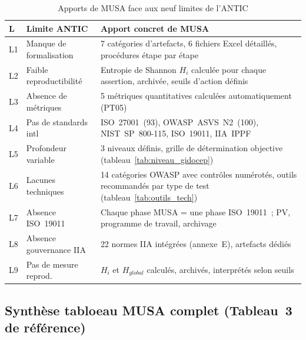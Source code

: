 \documentclass[12pt,a4paper,oneside]{report}
\begin{document}
\begin{table}[H]
\centering\small
\caption{Apports de MUSA face aux neuf limites de l'ANTIC}
\label{tab:apports_finaux}
\begin{tabularx}{\textwidth}{p{0.5cm}p{3.5cm}X}
\toprule
\rowcolor{theadcolor}
\color{white}\textbf{L} &
\color{white}\textbf{Limite ANTIC} &
\color{white}\textbf{Apport concret de MUSA} \\
\midrule
L1 & Manque de formalisation &
  7 cat\'egories d'artefacts, 6 fichiers Excel d\'etaill\'es, proc\'edures
  \'etape par \'etape \\
L2 & Faible reproductibilit\'e &
  Entropie de Shannon $H_i$ calcul\'ee pour chaque assertion, archiv\'ee, seuils
  d'action d\'efinis \\
L3 & Absence de m\'etriques &
  5 m\'etriques quantitatives calcul\'ees automatiquement (PT05) \\
L4 & Pas de standards intl &
  ISO~27001~(93), OWASP~ASVS~N2~(100), NIST~SP~800-115, ISO~19011, IIA~IPPF \\
L5 & Profondeur variable &
  3 niveaux d\'efinis, grille de d\'etermination objective (tableau~\ref{tab:niveau_gidocep}) \\
L6 & Lacunes techniques &
  14 cat\'egories OWASP avec contr\^oles num\'erot\'es, outils recommand\'es par
  type de test (tableau~\ref{tab:outils_tech}) \\
L7 & Absence ISO~19011 &
  Chaque phase MUSA = une phase ISO~19011~; PV, programme de travail, archivage \\
L8 & Absence gouvernance IIA &
  22 normes IIA int\'egr\'ees (annexe~E), artefacts d\'edi\'es \\
L9 & Pas de mesure reprod. &
  $H_i$ et $H_{global}$ calcul\'es, archiv\'es, interpr\'et\'es selon seuils \\
\bottomrule
\end{tabularx}
\end{table}

\subsection{Synth\`ese tabloeau MUSA complet (Tableau~3 de r\'ef\'erence)}
\end{document}
